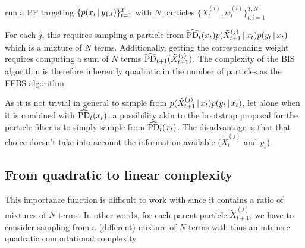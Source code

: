 %
\begin{algorithm}[!h]\small
	\caption{\label{alg:bisquad}}
	\begin{algorithmic}[1]
		\State run a PF targeting $\{p(x_{t}\,|\, y_{1:t})\}_{t=1}^{T}$ with $N$ particles $\{X^{(i)}_{t}, w^{(i)}_{t}\}_{t,i=1}^{T,N}$
		\EndFor
	\end{algorithmic}
\end{algorithm}
%

For each $j$, this requires sampling a particle from $\widehat{\text{PD}}_{t}(x_{t})p(\tilde X^{(j)}_{t+1}\,|\, x_{t})p(y_{t}\,|\, x_{t})$ which is a mixture of $N$ terms. Additionally, getting the corresponding weight requires computing a sum of $N$ terms $\widehat{\text{PD}}_{t+1}(\tilde X_{t+1}^{(j)})$. The complexity of the BIS algorithm is therefore inherently quadratic in the number of particles as the FFBS algorithm.

As it is not trivial in general to sample from $p(\tilde X^{(j)}_{t+1}\,|\, x_{t})p(y_{t}\,|\, x_{t})$, let alone when it is combined with $\widehat{\text{PD}}_{t}(x_{t})$, a possibility akin to the bootstrap proposal for the particle filter is to simply sample from $\widehat{\text{PD}}_{t}(x_{t})$. The disadvantage is that that choice doesn't take into account the information available ($\tilde X^{(j)}_{t}$ and $y_{t}$). 



\subsection{From quadratic to linear complexity}
This importance function is difficult to work with since it contains a ratio of mixtures of $N$ terms. In other words, for each parent particle $\tilde X^{(j)}_{t+1}$, we have to consider sampling from a (different) mixture of $N$ terms with thus an intrinsic quadratic computational complexity. 


